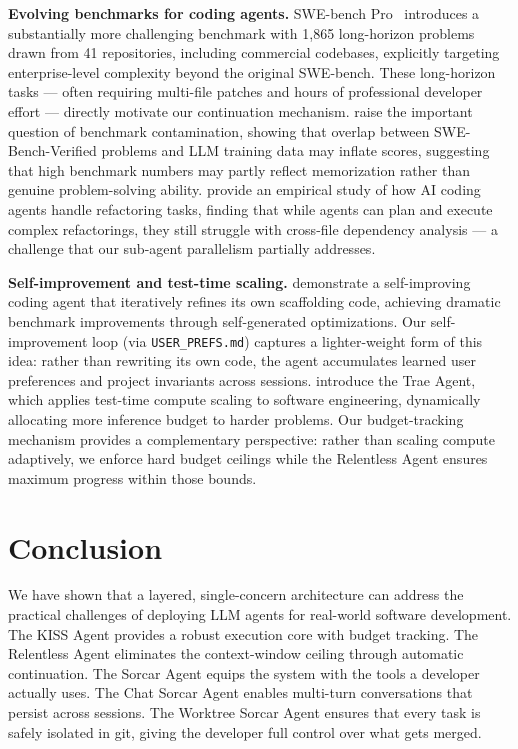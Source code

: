 \documentclass{article}
\begin{document}
\textbf{Evolving benchmarks for coding agents.}
SWE-bench Pro~\citep{deng2025swebenchpro} introduces a substantially
more challenging benchmark with 1,865 long-horizon problems drawn from
41 repositories, including commercial codebases, explicitly targeting
enterprise-level complexity beyond the original SWE-bench.  These
long-horizon tasks --- often requiring multi-file patches and hours of
professional developer effort --- directly motivate our continuation
mechanism.  \citet{prathifkumar2025swebenchverified}
raise the important question of benchmark contamination, showing that
overlap between SWE-Bench-Verified problems and LLM training data may
inflate scores, suggesting that high benchmark numbers may partly
reflect memorization rather than genuine problem-solving ability.
\citet{horikawa2025agentic} provide an empirical study of how
AI coding agents handle refactoring tasks, finding that while agents
can plan and execute complex refactorings, they still struggle with
cross-file dependency analysis --- a challenge that our sub-agent
parallelism partially addresses.

\textbf{Self-improvement and test-time scaling.}
\citet{robeyns2025selfimproving} demonstrate a self-improving coding
agent that iteratively refines its own scaffolding code, achieving
dramatic benchmark improvements through self-generated optimizations.
Our self-improvement loop (via \texttt{USER\_PREFS.md}) captures a
lighter-weight form of this idea: rather than rewriting its own code,
the agent accumulates learned user preferences and project
invariants across sessions.  \citet{gao2025trae} introduce the Trae
Agent, which applies test-time compute scaling to software engineering,
dynamically allocating more inference budget to harder problems.  Our
budget-tracking mechanism provides a complementary perspective: rather
than scaling compute adaptively, we enforce hard
budget ceilings while the Relentless Agent ensures maximum progress
within those bounds.

\section{Conclusion}
\label{sec:conclusion}

We have shown that a layered, single-concern architecture can address
the practical challenges of deploying LLM agents for real-world
software development.  The KISS Agent provides a robust execution core
with budget tracking.  The Relentless Agent eliminates the
context-window ceiling through automatic continuation.  The Sorcar
Agent equips the system with the tools a developer actually uses.  The
Chat Sorcar Agent enables multi-turn conversations that persist across
sessions.  The Worktree Sorcar Agent ensures that every task is safely
isolated in git, giving the developer full control over what gets
merged.
\end{document}
